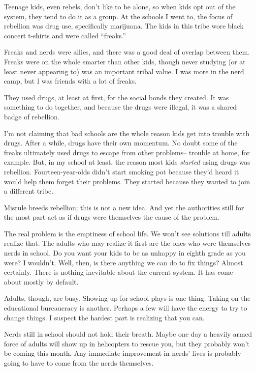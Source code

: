 \documentclass[12pt]{book}
\begin{document}
Teenage kids, even rebels, don't like to be alone, so when kids opt out
of the system, they tend to do it as a group. At the schools I went to,
the focus of rebellion was drug use, specifically marijuana. The kids in
this tribe wore black concert t-shirts and were called ``freaks.''

Freaks and nerds were allies, and there was a good deal of overlap
between them. Freaks were on the whole smarter than other kids, though
never studying (or at least never appearing to) was an important tribal
value. I was more in the nerd camp, but I was friends with a lot of
freaks.

They used drugs, at least at first, for the social bonds they created.
It was something to do together, and because the drugs were illegal, it
was a shared badge of rebellion.

I'm not claiming that bad schools are the whole reason kids get into
trouble with drugs. After a while, drugs have their own momentum. No
doubt some of the freaks ultimately used drugs to escape from other
problems-- trouble at home, for example. But, in my school at least, the
reason most kids \emph{started} using drugs was rebellion.
Fourteen-year-olds didn't start smoking pot because they'd heard it
would help them forget their problems. They started because they wanted
to join a different tribe.

Misrule breeds rebellion; this is not a new idea. And yet the
authorities still for the most part act as if drugs were themselves the
cause of the problem.

The real problem is the emptiness of school life. We won't see solutions
till adults realize that. The adults who may realize it first are the
ones who were themselves nerds in school. Do you want your kids to be as
unhappy in eighth grade as you were? I wouldn't. Well, then, is there
anything we can do to fix things? Almost certainly. There is nothing
inevitable about the current system. It has come about mostly by
default.

Adults, though, are busy. Showing up for school plays is one thing.
Taking on the educational bureaucracy is another. Perhaps a few will
have the energy to try to change things. I suspect the hardest part is
realizing that you can.

Nerds still in school should not hold their breath. Maybe one day a
heavily armed force of adults will show up in helicopters to rescue you,
but they probably won't be coming this month. Any immediate improvement
in nerds' lives is probably going to have to come from the nerds
themselves.
\end{document}
